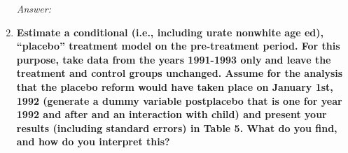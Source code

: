 \documentclass{article}
\begin{document}
\begin{enumerate}
\textit{Answer: }

\item \textbf{  Estimate a conditional (i.e., including urate nonwhite age ed), “placebo” treatment model on the pre-treatment period. For this purpose, take data from the years 1991-1993 only and leave the treatment and control groups unchanged. Assume for the analysis that the placebo reform would have taken place on January 1st, 1992 (generate a dummy variable postplacebo that is one for year 1992 and after and an interaction with child) and present your results (including standard errors) in Table 5. What do you find, and how do you interpret this? }



\end{enumerate}
\end{document}
